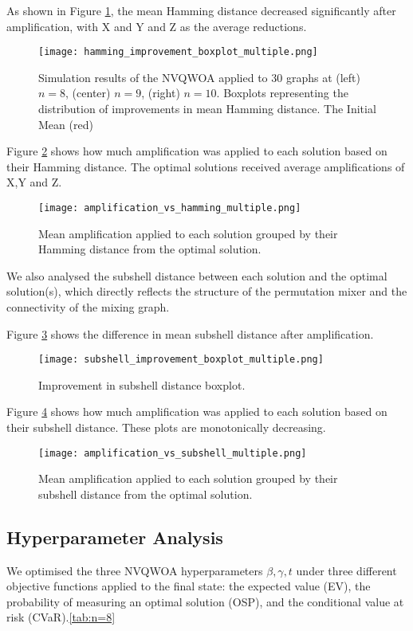 As shown in Figure \ref{fig:ham improvement}, the mean Hamming distance decreased significantly after amplification, with X and Y and Z as the average reductions.
\begin{figure}[htbp]
    \centering
    \texttt{[image: hamming\_improvement\_boxplot\_multiple.png]}
    \caption{Simulation results of the NVQWOA applied to 30 graphs at (left)$n=8$, (center) $n=9$, (right) $n=10$. Boxplots representing the distribution of improvements in mean Hamming distance. The Initial Mean (red)}
    \label{fig:ham improvement}
\end{figure}

Figure \ref{fig:amp vs ham} shows how much amplification was applied to each solution based on their Hamming distance. The optimal solutions received average amplifications of X,Y and Z.
\begin{figure}[htbp]
    \centering
    \texttt{[image: amplification\_vs\_hamming\_multiple.png]}
    \caption{Mean amplification applied to each solution grouped by their Hamming distance from the optimal solution.}
    \label{fig:amp vs ham}
\end{figure}

We also analysed the subshell distance between each solution and the optimal solution(s), which directly reflects the structure of the permutation mixer and the connectivity of the mixing graph.

Figure \ref{fig:sub improvement} shows the difference in mean subshell distance after amplification.
\begin{figure}[htbp]
    \centering
    \texttt{[image: subshell\_improvement\_boxplot\_multiple.png]}
    \caption{Improvement in subshell distance boxplot.}
    \label{fig:sub improvement}
\end{figure}

Figure \ref{fig:amp vs sub} shows how much amplification was applied to each solution based on their subshell distance. These plots are monotonically decreasing. 
\begin{figure}[htbp]
    \centering
    \texttt{[image: amplification\_vs\_subshell\_multiple.png]}
    \caption{Mean amplification applied to each solution grouped by their subshell distance from the optimal solution.}
    \label{fig:amp vs sub}
\end{figure}


\subsection{Hyperparameter Analysis}
We optimised the three NVQWOA hyperparameters $\beta, \gamma, t$ under three different objective functions applied to the final state: the expected value (EV), the probability of measuring an optimal solution (OSP), and the conditional value at risk (CVaR).\ref{tab:n=8}

